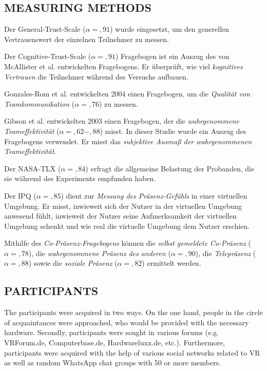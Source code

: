 \documentclass[sigchi]{acmart}
\begin{document}
\subsection{MEASURING METHODS}
Der General-Trust-Scale ($\alpha =,91$) \citep{couch1996assessment} wurde eingesetzt, um den generellen Vertrauenswert der einzelnen Teilnehmer zu messen. 

Der Cognitive-Trust-Scale ($\alpha =,91$) Fragebogen ist ein Auszug des von McAllister et al. \citep[S. 37]{mcallister1995affect} entwickelten Fragebogens. Er überprüft, wie viel \textit{kognitives Vertrauen} die Teilnehmer während des Versuchs aufbauen.

Gonzales-Rom et al. \citep[S. 1049]{gonzalez2014climate} entwickelten 2004 einen Fragebogen, um die \textit{Qualität von Teamkommunikation} ($\alpha =,76$) zu messen.

Gibson et al. \citep[S. 469]{gibson2003team} entwickelten 2003 einen Fragebogen, der die \textit{wahrgenommene Teameffektivität} ($\alpha =,62-,88$) misst. In dieser Studie wurde ein Auszug des Fragebogens verwendet. Er misst das \textit{subjektive Ausmaß der wahrgenommenen Teameffektivität}.

Der NASA-TLX ($\alpha =,84$) erfragt die allgemeine Belastung der Probanden, die sie während des Experiments empfunden haben. 

Der IPQ ($\alpha =,85$) dient zur \textit{Messung des Präsenz-Gefühls} in einer virtuellen Umgebung. Er misst, inwieweit sich der Nutzer in der virtuellen Umgebung anwesend fühlt, inwieweit der Nutzer seine Aufmerksamkeit der virtuellen Umgebung schenkt und wie real die virtuelle Umgebung dem Nutzer erschien. 

Mithilfe des \textit{Co-Präsenz-Fragebogens} können die \textit{selbst gemeldete Co-Präsenz} ($\alpha =,78$), die \textit{wahrgenommene Präsenz des anderen} ($\alpha =,90$), die \textit{Telepräsenz} ($\alpha =,88$) sowie die \textit{soziale Präsenz} ($\alpha =,82$) ermittelt werden.
\subsection{PARTICIPANTS}

The participants were acquired in two ways. On the one hand, people in the circle of acquaintances were approached, who would be provided with the necessary hardware. Secondly, participants were sought in various forums (e.g. VRForum.de, Computerbase.de, Hardwareluxx.de, etc.). Furthermore, participants were acquired with the help of various social networks related to VR as well as random WhatsApp chat groups with 50 or more members.
\end{document}
